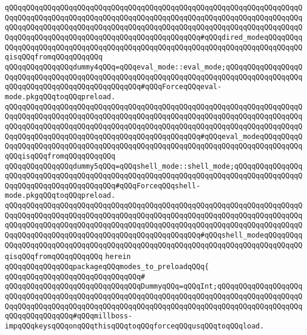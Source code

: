 \verb|qQQqqQQqqQQqqQQqqQQqqQQqqQQqqQQqqQQqqQQqqQQqqQQqqQQqqQQqqQQqqQQqqQQqqQQqqQQqqQQqqQQqqQQqqQQqqQQqqQQqqQQqqQQqqQQqqQQqqQQqqQQqqQQqqQQqqQQqqQQqqQQqqQQqqQQqqQQqqQQqqQQqqQQqqQQqqQQqqQQqqQQqqQQqqQQqqQQqqQQqqQQqqQQqqQQqqQQqqQQqqQQqqQQqqQQqqQQqqQQqqQQqqQQqqQQqqQQq#qQQqdired_modeqQQqqQQqqQQqqQQqqQQqqQQqqQQqqQQqqQQqqQQqqQQqqQQqqQQqqQQqqQQqqQQqqQQqqQQqqQQqqQQqisqQQqfromqQQqqQQqqQQq|\newline
\newline
\verb|qQQqqQQqqQQqqQQqdummy4qQQq=qQQqeval_mode::eval_mode;qQQqqQQqqQQqqQQqqQQqqQQqqQQqqQQqqQQqqQQqqQQqqQQqqQQqqQQqqQQqqQQqqQQqqQQqqQQqqQQqqQQqqQQqqQQqqQQqqQQqqQQqqQQqqQQqqQQqqQQq#qQQqForceqQQqeval-mode.pkgqQQqtoqQQqpreload.|\newline
\verb|qQQqqQQqqQQqqQQqqQQqqQQqqQQqqQQqqQQqqQQqqQQqqQQqqQQqqQQqqQQqqQQqqQQqqQQqqQQqqQQqqQQqqQQqqQQqqQQqqQQqqQQqqQQqqQQqqQQqqQQqqQQqqQQqqQQqqQQqqQQqqQQqqQQqqQQqqQQqqQQqqQQqqQQqqQQqqQQqqQQqqQQqqQQqqQQqqQQqqQQqqQQqqQQqqQQqqQQqqQQqqQQqqQQqqQQqqQQqqQQqqQQqqQQqqQQqqQQq#qQQqeval_modeqQQqqQQqqQQqqQQqqQQqqQQqqQQqqQQqqQQqqQQqqQQqqQQqqQQqqQQqqQQqqQQqqQQqqQQqqQQqqQQqqQQqisqQQqfromqQQqqQQqqQQq|\newline
\newline
\verb|qQQqqQQqqQQqqQQqdummy5qQQq=qQQqshell_mode::shell_mode;qQQqqQQqqQQqqQQqqQQqqQQqqQQqqQQqqQQqqQQqqQQqqQQqqQQqqQQqqQQqqQQqqQQqqQQqqQQqqQQqqQQqqQQqqQQqqQQqqQQqqQQqqQQqqQQq#qQQqForceqQQqshell-mode.pkgqQQqtoqQQqpreload.|\newline
\verb|qQQqqQQqqQQqqQQqqQQqqQQqqQQqqQQqqQQqqQQqqQQqqQQqqQQqqQQqqQQqqQQqqQQqqQQqqQQqqQQqqQQqqQQqqQQqqQQqqQQqqQQqqQQqqQQqqQQqqQQqqQQqqQQqqQQqqQQqqQQqqQQqqQQqqQQqqQQqqQQqqQQqqQQqqQQqqQQqqQQqqQQqqQQqqQQqqQQqqQQqqQQqqQQqqQQqqQQqqQQqqQQqqQQqqQQqqQQqqQQqqQQqqQQqqQQqqQQq#qQQqshell_modeqQQqqQQqqQQqqQQqqQQqqQQqqQQqqQQqqQQqqQQqqQQqqQQqqQQqqQQqqQQqqQQqqQQqqQQqqQQqqQQqisqQQqfromqQQqqQQqqQQq|\newline
\verb|herein|\newline
\newline
\verb|qQQqqQQqqQQqqQQqpackageqQQqmodes_to_preloadqQQq{|\newline
\verb|qQQqqQQqqQQqqQQqqQQqqQQqqQQqqQQq#|\newline
\verb|qQQqqQQqqQQqqQQqqQQqqQQqqQQqqQQqDummyqQQq=qQQqInt;qQQqqQQqqQQqqQQqqQQqqQQqqQQqqQQqqQQqqQQqqQQqqQQqqQQqqQQqqQQqqQQqqQQqqQQqqQQqqQQqqQQqqQQqqQQqqQQqqQQqqQQqqQQqqQQqqQQqqQQqqQQqqQQqqQQqqQQqqQQqqQQqqQQqqQQqqQQqqQQqqQQqqQQqqQQqqQQq#qQQqmillboss-impqQQqkeysqQQqonqQQqthisqQQqtoqQQqforceqQQqusqQQqtoqQQqload.|\newline
